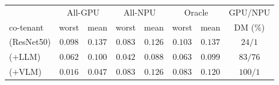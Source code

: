 \begin{tabular}{lcc|cc|cc|c}
\toprule
 & \multicolumn{2}{c|}{All-GPU} & \multicolumn{2}{c|}{All-NPU} & \multicolumn{2}{c|}{Oracle} & GPU/NPU \\
co-tenant & worst & mean & worst & mean & worst & mean & DM (\%) \\
\midrule
\Lcnn{} (ResNet50)   & $0.098$ & $0.137$ & $0.083$ & $0.126$ & $0.103$ & $0.137$ & $24 / 1$ \\
\Llm{} ($+$LLM)   & $0.062$ & $0.100$ & $0.042$ & $0.088$ & $0.063$ & $0.099$ & $83 / 76$ \\
\Lvlm{} ($+$VLM)  & $0.016$ & $0.047$ & $0.083$ & $0.126$ & $0.083$ & $0.120$ & $100 / 1$ \\
\bottomrule
\end{tabular}
